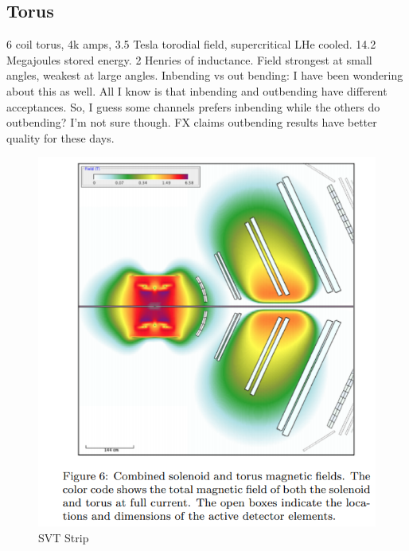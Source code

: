 			

        \subsection{Torus}
            6 coil torus, 4k amps, 3.5 Tesla torodial field, supercritical LHe cooled. 14.2 Megajoules stored energy. 2 Henries of inductance. Field strongest at small angles, weakest at large angles. 
              Inbending vs out bending:
        I have been wondering about this as well. All I know is that inbending and outbending have different acceptances.
        So, I guess some channels prefers inbending while the others do outbending? I’m not sure though. FX claims outbending results have better quality for these days. 
            									
			 \begin{figure}[H]
    			\centering
    			\includegraphics[width=12cm]{CLAS-12/modules/clas-12-system/pics/fd/torus.PNG}
    			\caption{SVT Strip}
			\end{figure}
                        

